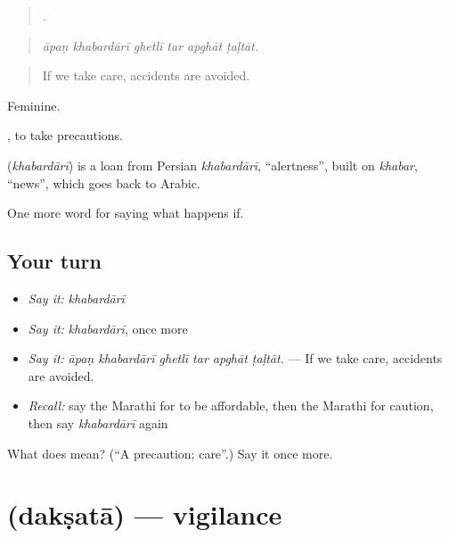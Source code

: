 \begin{quote}
     .
\end{quote}

\begin{quote}
\emph{āpaṇ khabardārī ghetlī tar apghāt ṭaḷtāt.}
\end{quote}

\begin{quote}
If we take care, accidents are avoided.
\end{quote}

Feminine.

 , to take precautions.

\begin{cousinweb}
\textbf{} (\emph{khabardārī}) is a loan from Persian \emph{khabardārī}, \textquotedblleft{}alertness\textquotedblright{}, built on \emph{khabar}, \textquotedblleft{}news\textquotedblright{}, which goes back to Arabic.
\end{cousinweb}

\begin{grammarlens}[title={What you've built}]
One more word for saying what happens if.
\end{grammarlens}

\subsection*{Your turn}
\begin{itemize}
\raggedright
  \item \emph{Say it:} \emph{khabardārī}
  \item \emph{Say it:} \emph{khabardārī}, once more
  \item \emph{Say it:} \emph{āpaṇ khabardārī ghetlī tar apghāt ṭaḷtāt.} — If we take care, accidents are avoided.
  \item \emph{Recall:} say the Marathi for to be affordable, then the Marathi for caution, then say \emph{khabardārī} again
\end{itemize}

\begin{tcolorbox}[breakable,colback=teal!4,colframe=teal!35!black,title={Before you move on}]
What does  mean? (\textquotedblleft{}A precaution; care\textquotedblright{}.) Say it once more.
\end{tcolorbox}
\section[\texorpdfstring{\mr{दक्षता} (dakṣatā)}{दक्षता (dakṣatā)}]{ (dakṣatā) — vigilance}

